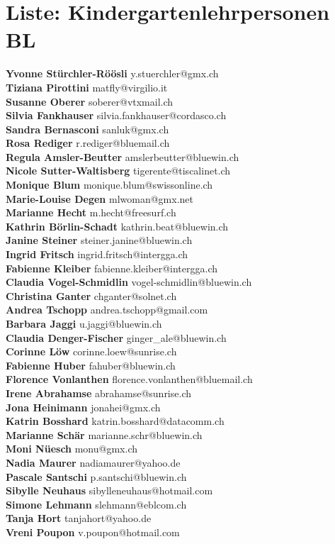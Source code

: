 \documentclass{scrartcl}
\begin{document}
\section*{Liste: Kindergartenlehrpersonen BL}
\textbf{Yvonne Stürchler-Röösli } y.stuerchler@gmx.ch\\
\textbf{Tiziana Pirottini } matfly@virgilio.it\\
\textbf{Susanne Oberer } soberer@vtxmail.ch\\
\textbf{Silvia Fankhauser } silvia.fankhauser@cordasco.ch\\
\textbf{Sandra Bernasconi } sanluk@gmx.ch\\
\textbf{Rosa Rediger } r.rediger@bluemail.ch\\
\textbf{Regula Amsler-Beutter } amslerbeutter@bluewin.ch\\
\textbf{Nicole Sutter-Waltisberg } tigerente@tiscalinet.ch\\
\textbf{Monique Blum } monique.blum@swissonline.ch\\
\textbf{Marie-Louise Degen } mlwoman@gmx.net\\
\textbf{Marianne Hecht } m.hecht@freesurf.ch\\
\textbf{Kathrin Börlin-Schadt } kathrin.beat@bluewin.ch\\
\textbf{Janine Steiner } steiner.janine@bluewin.ch\\
\textbf{Ingrid Fritsch } ingrid.fritsch@intergga.ch\\
\textbf{Fabienne Kleiber } fabienne.kleiber@intergga.ch\\
\textbf{Claudia Vogel-Schmidlin } vogel-schmidlin@bluewin.ch\\
\textbf{Christina Ganter } chganter@solnet.ch\\
\textbf{Andrea Tschopp } andrea.tschopp@gmail.com\\
\textbf{Barbara Jaggi } u.jaggi@bluewin.ch\\
\textbf{Claudia Denger-Fischer } ginger_ale@bluewin.ch\\
\textbf{Corinne Löw } corinne.loew@sunrise.ch\\
\textbf{Fabienne Huber } fahuber@bluewin.ch\\
\textbf{Florence Vonlanthen } florence.vonlanthen@bluemail.ch\\
\textbf{Irene Abrahamse } abrahamse@sunrise.ch\\
\textbf{Jona Heinimann } jonahei@gmx.ch\\
\textbf{Katrin Bosshard } katrin.bosshard@datacomm.ch\\
\textbf{Marianne Schär } marianne.schr@bluewin.ch\\
\textbf{Moni Nüesch } monu@gmx.ch\\
\textbf{Nadia Maurer } nadiamaurer@yahoo.de\\
\textbf{Pascale Santschi } p.santschi@bluewin.ch\\
\textbf{Sibylle Neuhaus } sibylleneuhaus@hotmail.com\\
\textbf{Simone Lehmann } slehmann@eblcom.ch\\
\textbf{Tanja Hort } tanjahort@yahoo.de\\
\textbf{Vreni Poupon } v.poupon@hotmail.com\\
\end{document}
